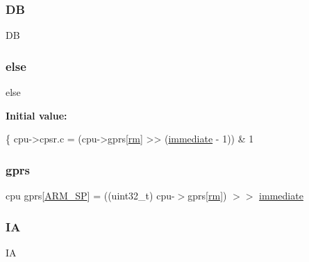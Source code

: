 \subsubsection{\texorpdfstring{DB}{DB}}
{\footnotesize\ttfamily DB}

\mbox{\label{isa-thumb_8c_a0544c3fe466e421738dae463968b70ba}} 
\subsubsection{\texorpdfstring{else}{else}}
{\footnotesize\ttfamily else}

{\bfseries Initial value\+:}
\begin{DoxyCode}
\{
        cpu->cpsr.c = (cpu->gprs[\mbox{\hyperlink{isa-thumb_8c_a20e40d2fb8c51fa4dd2b4449ad32e111}{rm}}] >> (\mbox{\hyperlink{decoder-arm_8c_a8bc2501cb64b3bc9ac59754cfafb68d1}{immediate}} - 1)) & 1
\end{DoxyCode}
\mbox{\label{isa-thumb_8c_a6b4b7e13a9a144391615b217c5917bc7}} 
\subsubsection{\texorpdfstring{gprs}{gprs}}
{\footnotesize\ttfamily cpu gprs\mbox{[}\mbox{\hyperlink{isa-thumb_8c_acce42da2f3c8524d613be6906db2e0c9}{A\+R\+M\+\_\+\+SP}}\mbox{]} = ((uint32\+\_\+t) cpu-\/$>$gprs\mbox{[}\mbox{\hyperlink{isa-thumb_8c_a20e40d2fb8c51fa4dd2b4449ad32e111}{rm}}\mbox{]}) $>$$>$ \mbox{\hyperlink{lr35902_2decoder_8c_a8bc2501cb64b3bc9ac59754cfafb68d1}{immediate}}}

\mbox{\label{isa-thumb_8c_a3048b70ae3e6d982e60f063bd78fda51}} 
\subsubsection{\texorpdfstring{IA}{IA}}
{\footnotesize\ttfamily IA}

\mbox{\label{isa-thumb_8c_adaadec1ef48bb32b80ea5572e7d12ca6}} 
